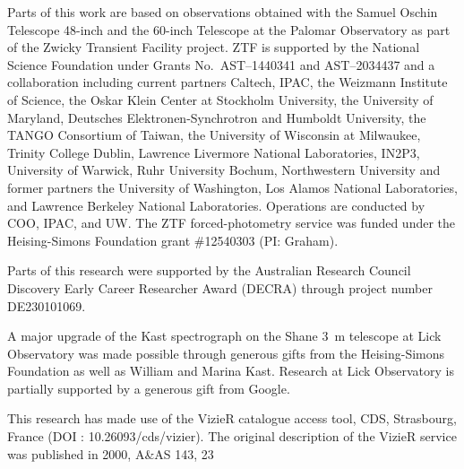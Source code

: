 \documentclass[twocolumn]{aastex63}
\begin{document}
Parts of this work are based on observations obtained with the Samuel Oschin Telescope 48-inch and the 60-inch Telescope at the Palomar Observatory as part of the Zwicky Transient Facility project. ZTF is supported by the National Science Foundation under Grants No.\ AST--1440341 and AST--2034437 and a collaboration including current partners Caltech, IPAC, the Weizmann Institute of Science, the Oskar Klein Center at Stockholm University, the University of Maryland, Deutsches Elektronen-Synchrotron and Humboldt University, the TANGO Consortium of Taiwan, the University of Wisconsin at Milwaukee, Trinity College Dublin, Lawrence Livermore National Laboratories, IN2P3, University of Warwick, Ruhr University Bochum, Northwestern University and former partners the University of Washington, Los Alamos National Laboratories, and Lawrence Berkeley National Laboratories. Operations are conducted by COO, IPAC, and UW.
The ZTF forced-photometry service was funded under the Heising-Simons Foundation grant \#12540303 (PI: Graham). 

Parts of this research were supported by the Australian Research Council Discovery Early Career Researcher Award (DECRA) through project number DE230101069. 

A major upgrade of the Kast spectrograph on the Shane 3~m telescope at Lick Observatory was made possible through generous gifts from the Heising-Simons Foundation as well as William and Marina Kast. Research at Lick Observatory is partially supported by a generous gift from Google. 

This research has made use of the VizieR catalogue access tool, CDS, Strasbourg, France (DOI : 10.26093/cds/vizier). The original description of the VizieR service was published in 2000, A\&AS 143, 23


{}


\appendix
\label{sec:appendix}

\end{document}
